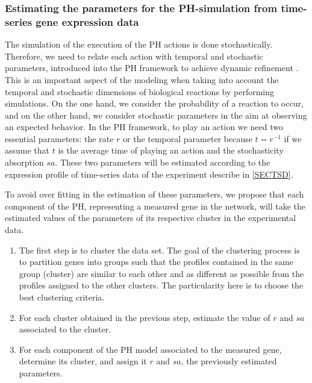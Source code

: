 





\subsubsection{Estimating the parameters for the PH-simulation from time-series gene expression data}


The simulation of the execution of the PH actions is done stochastically.  Therefore, we need to relate each action with temporal 
and stochastic parameters, introduced into the PH framework to achieve dynamic refinement \cite{PMR10-TCSB}. 
This is an important aspect of the modeling when taking into account the temporal and stochastic dimensions of 
biological reactions by performing simulations. 
On the one hand, we consider the probability of a reaction to occur, and on the other hand, we 
consider stochastic parameters in the aim at observing an expected behavior. 
In the PH framework, to play an action we need two essential parameters: the rate $r$ or the temporal parameter because $t=r^{-1}$ if we assume that $t$ is the average time of playing an action
and the stochasticity absorption $sa$. These two parameters will be estimated according to the expression profile of time-series data of the experiment
describe in \ref{SECTSD}. 


To avoid over fitting in the estimation of these parameters, we propose that each component of the PH, representing a measured gene in the network,  will take the estimated values of the parameters of its respective cluster in the experimental data.



\begin{enumerate}
 \item The first step is to cluster the data set. The goal of the clustering process is to partition genes into groups such that the 
 profiles contained in the same group (cluster) are similar to each other and as different as possible from the profiles assigned to the other
 clusters. The particularity here is to choose the best clustering criteria.
 \item For each cluster obtained in the previous step, estimate the value of $r$ and $sa$ associated to the cluster.
 \item For each component of the PH model associated to the measured gene, determine its cluster, and assign it $r$ and $sa$, the previously  estimated  parameters.
\end{enumerate}

